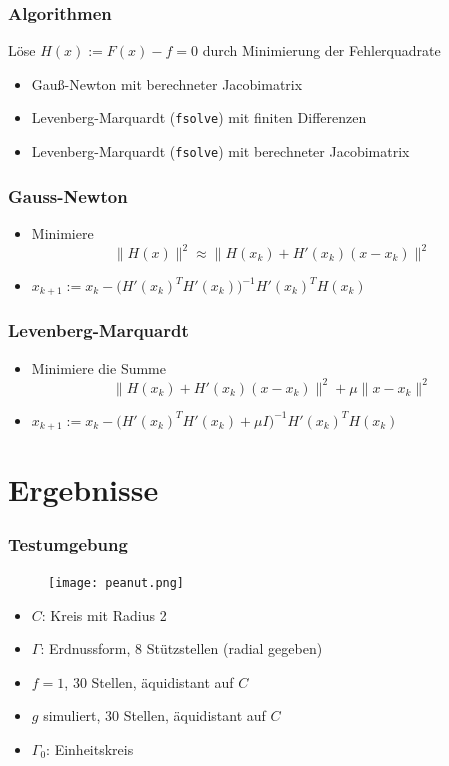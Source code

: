 \documentclass{beamer}
\begin{document}
\begin{frame}
	\frametitle{Algorithmen}
	Löse $H(x) := F(x) - f = 0$ durch Minimierung der Fehlerquadrate
	\begin{itemize}
		\item
			Gauß-Newton mit berechneter Jacobimatrix
		\item
			Levenberg-Marquardt (\texttt{fsolve}) mit finiten Differenzen
		\item
			Levenberg-Marquardt (\texttt{fsolve}) mit berechneter Jacobimatrix
	\end{itemize}
\end{frame}

\begin{frame}
	\frametitle{Gauss-Newton}
	\begin{itemize}
		\item
			Minimiere
			\[
				\|H(x)\|^2 \approx \|H(x_k) + H'(x_k)(x-x_k)\|^2
			\]
		\item
			$x_{k+1} := x_k - \Big(H'(x_k)^T H'(x_k)\Big)^{-1} H'(x_k)^T H(x_k)$
	\end{itemize}
\end{frame}

\begin{frame}
	\frametitle{Levenberg-Marquardt}
	\begin{itemize}
		\item
			Minimiere die Summe
			\[
				\|H(x_k) + H'(x_k)(x-x_k)\|^2 + \mu \|x-x_k\|^2
			\]
		\item
			$x_{k+1} := x_k - \Big(H'(x_k)^T H'(x_k) + \mu I \Big)^{-1} H'(x_k)^T H(x_k)$
	\end{itemize}
\end{frame}

\section{Ergebnisse}

\begin{frame}
	\frametitle{Testumgebung}
	\begin{minipage}{0.5\textwidth}
		\begin{figure}
			\centering
			\texttt{[image: peanut.png]}
		\end{figure}
	\end{minipage}
	\begin{minipage}{0.48\textwidth}
		\begin{itemize}
			\item \pause
				$C$: Kreis mit Radius 2
			\item
				$\Gamma$: Erdnussform, $8$ Stützstellen (radial gegeben)
			\item
				$f = 1$, $30$ Stellen, äquidistant auf $C$
			\item
				$g$ simuliert, $30$ Stellen, äquidistant auf $C$
			\item
				$\Gamma_0$: Einheitskreis
		\end{itemize}
	\end{minipage}
\end{frame}
\end{document}
